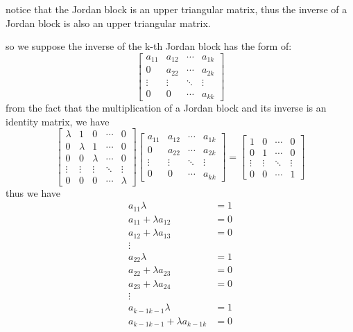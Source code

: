 \documentclass[12pt,a4paper]{article}
\begin{document}
notice that the Jordan block is an upper triangular matrix, 
thus the inverse of a Jordan block is also an upper triangular matrix.

so we suppose the inverse of the k-th Jordan block has the form of:
\[
    \begin{bmatrix}
        a_{11} & a_{12} & \cdots & a_{1k} \\
        0      & a_{22} & \cdots & a_{2k} \\
        \vdots & \vdots & \ddots & \vdots \\
        0      & 0      & \cdots & a_{kk}

    \end{bmatrix}
\]
from the fact that the multiplication of a Jordan block and its inverse is an identity matrix, we have
\[
    \begin{bmatrix}
        \lambda & 1      & 0      & \cdots & 0      \\
        0       & \lambda & 1      & \cdots & 0      \\
        0       & 0      & \lambda & \cdots & 0      \\
        \vdots  & \vdots & \vdots & \ddots & \vdots \\
        0       & 0      & 0      & \cdots & \lambda
    \end{bmatrix} \begin{bmatrix}
        a_{11} & a_{12} & \cdots & a_{1k} \\
        0      & a_{22} & \cdots & a_{2k} \\
        \vdots & \vdots & \ddots & \vdots \\
        0      & 0      & \cdots & a_{kk}
    \end{bmatrix} = \begin{bmatrix}
        1 & 0 & \cdots & 0 \\
        0 & 1 & \cdots & 0 \\
        \vdots & \vdots & \ddots & \vdots \\
        0 & 0 & \cdots & 1
    \end{bmatrix}
\]
thus we have
\[
    \begin{aligned}
        a_{11} \lambda & = 1 \\
        a_{11} + \lambda a_{12} & = 0 \\
        a_{12} + \lambda a_{13} & = 0 \\
        \vdots & \\
        a_{22} \lambda & = 1 \\
        a_{22} + \lambda a_{23} &= 0 \\
        a_{23} + \lambda a_{24} &= 0 \\
        \vdots & \\
        a_{k-1 k-1} \lambda & = 1 \\
        a_{k-1 k-1} + \lambda a_{k-1 k} &= 0 \\
    \end{aligned}
\]
\end{document}
